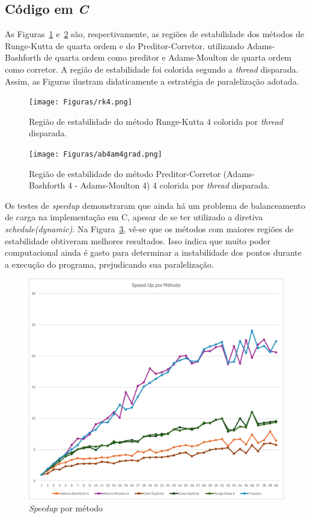 \documentclass[a4paper,12pt]{article}
\begin{document}

\subsection{Código em \textit{C}}

As Figuras~\ref{fig:rk4} e~\ref{fig:abam4} são,
respectivamente,
as regiões de estabilidade dos métodos de Runge-Kutta de quarta ordem e do Preditor-Corretor. utilizando Adams-Bashforth de quarta ordem como preditor e Adams-Moulton de quarta ordem como corretor. 
A região de estabilidade foi colorida segundo a \textit{thread} disparada. Assim, as Figuras ilustram didaticamente a estratégia de paralelização adotada.

\begin{figure}[H]
    \centering
    \texttt{[image: Figuras/rk4.png]}
    \caption{Região de estabilidade do método Runge-Kutta 4 colorida por \textit{thread} disparada.}
    \label{fig:rk4}
\end{figure}

\begin{figure}[H]
    \centering
    \texttt{[image: Figuras/ab4am4grad.png]}
    \caption{Região de estabilidade do método Preditor-Corretor (Adams-Bashforth 4 - Adams-Moulton 4) 4 colorida por \textit{thread} disparada.}
    \label{fig:abam4}
\end{figure}

Os testes de \textit{speedup} demonstraram que ainda há um problema de balanceamento de carga na implementação em C, apesar de se ter utilizado a diretiva \textit{schedule(dynamic)}. Na Figura~\ref{fig:speedupc},
vê-se que os métodos com maiores regiões de estabilidade
obtiveram melhores resultados. 
Isso indica que muito poder computacional ainda é gasto para determinar a instabilidade dos pontos durante a execução do programa, prejudicando sua paralelização.

\begin{figure}[H]
    \centering
    \includegraphics[width=0.7
    \linewidth]{Figuras/speedupc.jpeg}
    \caption{\textit{Speedup} por método}
    \label{fig:speedupc}
\end{figure}



\newpage

\end{document}
